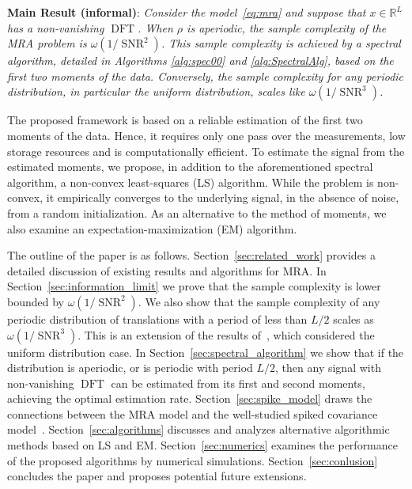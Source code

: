 \documentclass{IEEEtran}
\numberwithin{equation}{section}
\numberwithin{figure}{section}
\theoremstyle{plain}
\theoremstyle{definition}
\theoremstyle{remark}
\theoremstyle{plain}
\theoremstyle{remark}
\theoremstyle{plain}
\theoremstyle{plain}
\theoremstyle{remark}
\newcommand{\RL}{\mathbb{R}^L}
\newcommand{\DFT}{\operatorname{DFT}}
\newcommand{\SNR}{\operatorname{SNR}}
\begin{document}
\vspace{0.3cm}
\textbf{Main Result (informal)}: \emph{Consider the model~\eqref{eq:mra} and suppose that $x\in\RL$ has a non-vanishing $\DFT$. When $\rho$ is aperiodic, the sample complexity of the MRA problem is $\omega(1/\SNR^2)$. This sample complexity is achieved by a spectral algorithm, detailed in Algorithms \ref{alg:spec00} and \ref{alg:SpectralAlg}, based on the first two moments of the data. Conversely, the sample complexity for any periodic distribution, in particular the uniform distribution, scales like $\omega(1/\SNR^3)$.
}

\vspace{0.3cm}


The proposed framework is based on a reliable estimation of the first two moments of the data. Hence, it requires only one pass over the measurements, low storage resources and is computationally efficient. To estimate the signal from the estimated moments, we propose, in addition to the aforementioned spectral algorithm, a non-convex least-squares (LS) algorithm. While the problem is non-convex, it empirically converges to the underlying signal, in the absence of noise, from a random initialization. As an alternative to the method of moments, we also examine an expectation-maximization (EM) algorithm.

The outline of the paper is as follows. Section~\ref{sec:related_work} provides a detailed discussion of existing results and algorithms for MRA.
In Section~\ref{sec:information_limit} we prove that the sample complexity is lower bounded by $\omega(1/\SNR^2)$. We also show that the sample complexity of any periodic distribution of translations with a period of less than $L/2$ scales as $\omega(1/\SNR^3)$. This is an extension of the results of~\cite{bandeira2017optimal}, which considered the uniform distribution case. 
In Section~\ref{sec:spectral_algorithm} we show that if the distribution is aperiodic, or is periodic with period $L/2$, then any signal with non-vanishing $\DFT$ can be estimated from its first and second moments, achieving the optimal estimation rate.
Section~\ref{sec:spike_model} draws the connections between the MRA model and the well-studied spiked covariance model~\cite{johnstone2001distribution, paul2007asymptotics, gavish-donoho-2017, benaych2012singular,dobriban2017optimal}.
Section~\ref{sec:algorithms} discusses and analyzes alternative algorithmic methods based on LS and EM.
Section~\ref{sec:numerics} examines the performance of the proposed algorithms by numerical simulations. 
Section~\ref{sec:conlusion} concludes the paper and proposes potential future extensions.
\end{document}
